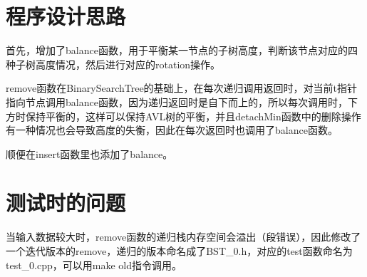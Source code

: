 \documentclass[UTF8]{ctexart}
\begin{document}
\pagestyle{fancy}
\fancyhead{}
\rhead{\today}

\section{程序设计思路}
首先，增加了balance函数，用于平衡某一节点的子树高度，判断该节点对应的四种子树高度情况，然后进行对应的rotation操作。

remove函数在BinarySearchTree的基础上，在每次递归调用返回时，对当前t指针指向节点调用balance函数，因为递归返回时是自下而上的，所以每次调用时，下方时保持平衡的，这样可以保持AVL树的平衡，并且detachMin函数中的删除操作有一种情况也会导致高度的失衡，因此在每次返回时也调用了balance函数。

顺便在insert函数里也添加了balance。

\section{测试时的问题}
当输入数据较大时，remove函数的递归栈内存空间会溢出（段错误），因此修改了一个迭代版本的remove，递归的版本命名成了BST\_0.h，对应的test函数命名为test\_0.cpp，可以用make old指令调用。
\end{document}

